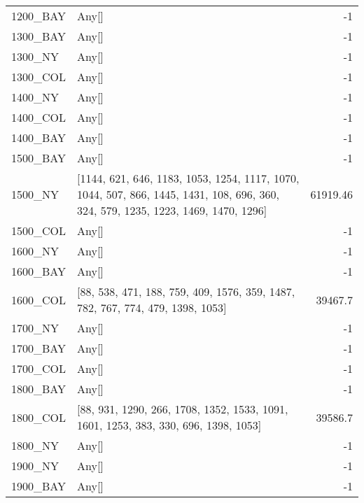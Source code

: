 \documentclass[main.tex]{subfiles}
\begin{document}
\begin{center}
\begin{tabular}{llr}
1200\_BAY & Any[] & -1\\
1300\_BAY & Any[] & -1\\
1300\_NY & Any[] & -1\\
1300\_COL & Any[] & -1\\
1400\_NY & Any[] & -1\\
1400\_COL & Any[] & -1\\
1400\_BAY & Any[] & -1\\
1500\_BAY & Any[] & -1\\
1500\_NY & [1144, 621, 646, 1183, 1053, 1254, 1117, 1070, 1044, 507, 866, 1445, 1431, 108, 696, 360, 324, 579, 1235, 1223, 1469, 1470, 1296] & 61919.46\\
1500\_COL & Any[] & -1\\
1600\_NY & Any[] & -1\\
1600\_BAY & Any[] & -1\\
1600\_COL & [88, 538, 471, 188, 759, 409, 1576, 359, 1487, 782, 767, 774, 479, 1398, 1053] & 39467.7\\
1700\_NY & Any[] & -1\\
1700\_BAY & Any[] & -1\\
1700\_COL & Any[] & -1\\
1800\_BAY & Any[] & -1\\
1800\_COL & [88, 931, 1290, 266, 1708, 1352, 1533, 1091, 1601, 1253, 383, 330, 696, 1398, 1053] & 39586.7\\
1800\_NY & Any[] & -1\\
1900\_NY & Any[] & -1\\
1900\_BAY & Any[] & -1\\
\hline\end{tabular}
\end{center}
\newpage
\end{document}
